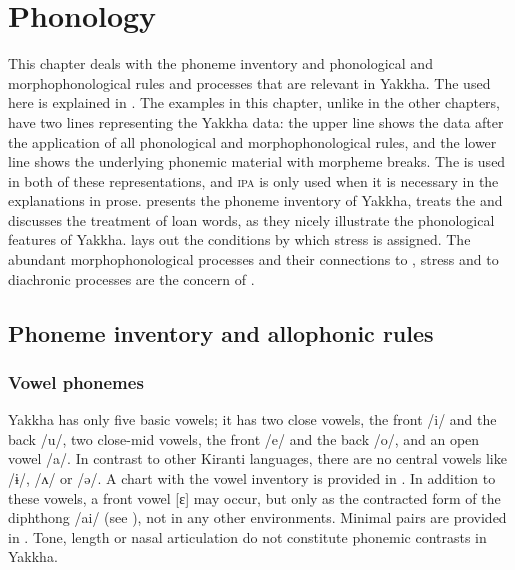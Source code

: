 ﻿\chapter{Phonology}\label{phon}


This chapter deals with the phoneme inventory and phonological  and morpho\-phonological rules and processes that are relevant in Yakkha. The  used here is explained  in . The examples in this chapter, unlike in the other chapters, have two lines representing the Yakkha data: the upper line shows the data after the application of all phonological and morphophonological rules, and the lower line shows the underlying phonemic material with morpheme breaks. The  is used in both of these representations, and \textsc{ipa} is only used when it is necessary in the explanations in prose.  presents the phoneme inventory of Yakkha,    treats the  and   discusses the treatment of loan words, as they nicely illustrate the phonological features of Yakkha.  lays out the conditions by which stress is assigned. The abundant morphophonological processes and their connections to , stress and to diachronic processes are the concern of . 


\section{Phoneme inventory and allophonic rules}\label{phon-inv}

\subsection{Vowel phonemes}\label{vowelphon}

Yakkha has only five basic vowels; it has two close vowels, the front /i/ and the back /u/, two close-mid vowels, the front /e/ and the back /o/, and an open vowel /a/. In contrast to other Kiranti languages,  there are no central vowels like  /ɨ/, /ʌ/ or /ə/. A chart with the vowel inventory is provided in . In addition to these vowels, a  front vowel [ɛ] may occur, but only as the  contracted form of the diphthong /ai/ (see ), not in any other environments. Minimal pairs are provided in . Tone, length or nasal articulation do not constitute phonemic contrasts in Yakkha. 

